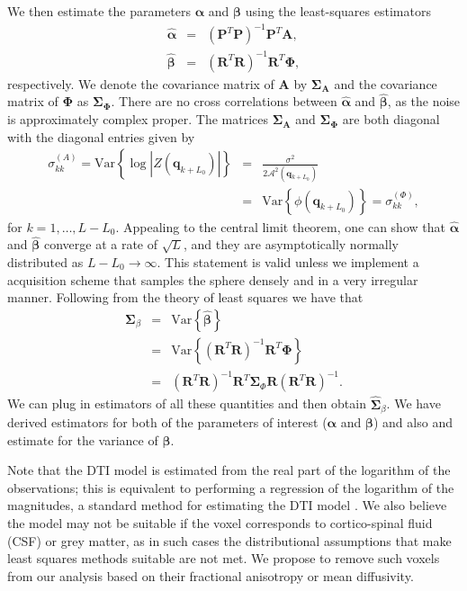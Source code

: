 \documentclass[authoryear,preprint,12pt]{elsarticle}
\newcommand{\var}{\text{Var}}
\newcommand{\q}{\mathbf{q}}
\newcommand{\bsS}{\bs{\Sigma}}
\newcommand{\cA}{\mathcal{A}}
\newcommand{\bld}[1]{\mathbf{#1}}
\newcommand{\bs}[1]{\boldsymbol{#1}}
\newcommand{\wh}[1]{\widehat{#1}}
\begin{document}
We then estimate the parameters $\bs{\alpha}$ and $\bs{\beta}$
using the least-squares estimators
\begin{eqnarray}
  \label{linear-amplitude}
  \hat{\bs{\alpha}} &=& \left(\bld{P}^T\bld{P}\right)^{-1}
  \bld{P}^T\bld{A},\\
  \label{linear-phase}
  \hat{\bs{\beta}} &=& \left(\bld{R}^T\bld{R}\right)^{-1}\bld{R}^T
  \bs{\Phi},
\end{eqnarray}
respectively.  We denote the covariance matrix of $\bld{A}$ by
$\bsS_\bld{A}$ and the covariance matrix of $\bs{\Phi}$ as
$\bsS_{\bs{\Phi}}$.  There are no cross correlations between
$\hat{\bs{\alpha}}$ and $\hat{\bs{\beta}}$, as the noise is
approximately complex proper.  The matrices $\bsS_\bld{A}$ and
$\bsS_{\bs{\Phi}}$ are both diagonal with the diagonal entries given
by
\begin{eqnarray*}
  \sigma_{kk}^{(A)} = \var\left\{\log\left|Z(\q_{k+L_0})\right|\right\} &=&
  \frac{\sigma^2}{2\cA^2(\q_{k+L_0})}\\
  &=& \var\left\{\phi(\q_{k+L_0})\right\} = \sigma_{kk}^{(\Phi)},
\end{eqnarray*}
for $k=1,\dots,L-L_0$.  Appealing to the central limit theorem, one
can show that $\hat{\bs{\alpha}}$ and $\hat{\bs{\beta}}$ converge at a
rate of $\sqrt{L}$, and they are asymptotically normally distributed
as $L-L_0\rightarrow\infty$.  This statement is valid unless we
implement a acquisition scheme that samples the sphere densely and in
a very irregular manner.  Following from the theory of least squares
we have that
\begin{eqnarray}
  \nonumber
  \bsS_{\beta} &=& \var\left\{\hat{\bs{\beta}}\right\}\\
  &=& \nonumber
  \var\left\{\left(\bld{R}^T\bld{R}\right)^{-1}\bld{R}^T\bs{\Phi}\right\}\\  
  &=& \left(\bld{R}^T\bld{R}\right)^{-1}\bld{R}^T
  \bsS_\Phi\bld{R} \left(\bld{R}^T\bld{R}\right)^{-1}.
\end{eqnarray}
We can plug in estimators of all these quantities and then obtain
$\wh{\bsS}_{\beta}$.  We have derived estimators for both of
the parameters of interest ($\bs{\alpha}$ and $\bs{\beta}$) and also
and estimate for the variance of $\bs{\beta}$.

Note that the DTI model is estimated from the real part of the
logarithm of the observations; this is equivalent to performing a
regression of the logarithm of the magnitudes, a standard method for
estimating the DTI model \citep{Basser1994}.  We also believe the
model may not be suitable if the voxel corresponds to cortico-spinal
fluid (CSF) or grey matter, as in such cases the distributional
assumptions that make least squares methods suitable are not met.  We
propose to remove such voxels from our analysis based on their
fractional anisotropy or mean diffusivity.
\end{document}
